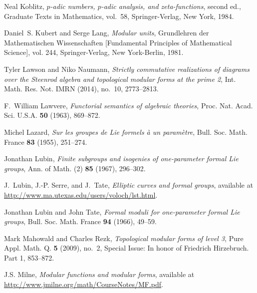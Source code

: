 \documentclass{gtpart}
\theoremstyle{definition}
\theoremstyle{remark}
\renewcommand{\=}{\approx}
\renewcommand{\-}{\sim}
\numberwithin{equation}{section}
\begin{document}
\begin{thebibliography}
Neal Koblitz, \emph{{$p$}-adic numbers, {$p$}-adic analysis, and
  zeta-functions}, second ed., Graduate Texts in Mathematics, vol.~58,
  Springer-Verlag, New York, 1984. 

Daniel~S. Kubert and Serge Lang, \emph{Modular units}, Grundlehren der
  Mathematischen Wissenschaften [Fundamental Principles of Mathematical
  Science], vol. 244, Springer-Verlag, New York-Berlin, 1981. 

Tyler Lawson and Niko Naumann, \emph{Strictly commutative realizations of
  diagrams over the {S}teenrod algebra and topological modular forms at the
  prime 2}, Int. Math. Res. Not. IMRN (2014), no.~10, 2773--2813. 

F.~William Lawvere, \emph{Functorial semantics of algebraic theories}, Proc.
  Nat. Acad. Sci. U.S.A. \textbf{50} (1963), 869--872. 

Michel Lazard, \emph{Sur les groupes de {L}ie formels \`a un param\`etre},
  Bull. Soc. Math. France \textbf{83} (1955), 251--274. 

Jonathan Lubin, \emph{Finite subgroups and isogenies of one-parameter formal
  {L}ie groups}, Ann. of Math. (2) \textbf{85} (1967), 296--302. 

J.~Lubin, J.-P. Serre, and J.~Tate, \emph{Elliptic curves and formal groups}, 
  available at \href{http://www.ma.utexas.edu/users/voloch/lst.html}
  {http://www.ma.utexas.edu/users/voloch/lst.html}.

Jonathan Lubin and John Tate, \emph{Formal moduli for one-parameter formal
  {L}ie groups}, Bull. Soc. Math. France \textbf{94} (1966), 49--59.

Mark Mahowald and Charles Rezk, \emph{Topological modular forms of level 3},
  Pure Appl. Math. Q. \textbf{5} (2009), no.~2, Special Issue: In honor of
  Friedrich Hirzebruch. Part 1, 853--872. 

J.S. Milne, \emph{Modular functions and modular forms}, available at \\
  \href{http://www.jmilne.org/math/CourseNotes/MF.pdf}
  {http://www.jmilne.org/math/CourseNotes/MF.pdf}.


\end{thebibliography}
\end{document}
